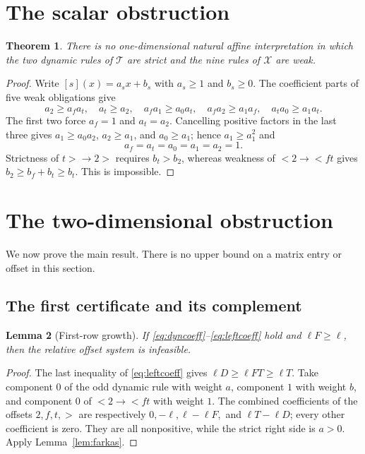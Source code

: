\documentclass[11pt]{article}
\newtheorem{theorem}{Theorem}[section]
\newtheorem{lemma}[theorem]{Lemma}
\theoremstyle{definition}
\newcommand{\Tsys}{\mathcal{T}}
\newcommand{\Xsys}{\mathcal{X}}
\begin{document}
\section{The scalar obstruction}

\begin{theorem}\label{thm:scalar}
There is no one-dimensional natural affine interpretation in which the two
dynamic rules of $\Tsys$ are strict and the nine rules of $\Xsys$ are weak.
\end{theorem}

\begin{proof}
Write $[s](x)=a_sx+b_s$ with $a_s\ge1$ and $b_s\ge0$.  The coefficient
parts of five weak obligations give
\[
 a_2\ge a_fa_t,\quad a_t\ge a_2,\quad
 a_fa_1\ge a_0a_t,\quad a_fa_2\ge a_1a_f,\quad
 a_ta_0\ge a_1a_t.
\]
The first two force $a_f=1$ and $a_t=a_2$.  Cancelling positive factors in
the last three gives
$a_1\ge a_0a_2$, $a_2\ge a_1$, and $a_0\ge a_1$; hence
$a_1\ge a_1^2$ and
\[
 a_f=a_t=a_0=a_1=a_2=1.
\]
Strictness of $t>\to2>$ requires $b_t>b_2$, whereas weakness of
$<2\to<ft$ gives $b_2\ge b_f+b_t\ge b_t$.  This is impossible.
\end{proof}

\section{The two-dimensional obstruction}

We now prove the main result.  There is no upper bound on a matrix entry or
offset in this section.

\subsection{The first certificate and its complement}

\begin{lemma}[First-row growth]\label{lem:first}
If \eqref{eq:dyncoeff}--\eqref{eq:leftcoeff} hold and
$\ell F\ge\ell$, then the relative offset system is infeasible.
\end{lemma}

\begin{proof}
The last inequality of \eqref{eq:leftcoeff} gives
$\ell D\ge\ell FT\ge\ell T$.  Take component $0$ of the odd dynamic
rule with weight $a$, component $1$ with weight $b$, and component $0$ of
$<2\to<ft$ with weight $1$.  The combined coefficients of the offsets
$2,f,t,>$ are respectively $0,-\ell,\ell-\ell F,$ and
$\ell T-\ell D$; every other coefficient is zero.  They are all
nonpositive, while the strict right side is $a>0$.  Apply
Lemma~\ref{lem:farkas}.
\end{proof}
\end{document}
